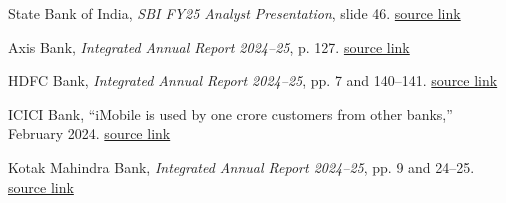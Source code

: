 \documentclass[10pt,a4paper]{article}
\begin{document}
\begin{enumerate}[label={[\arabic*]},leftmargin=24pt]
\item State Bank of India, \emph{SBI FY25 Analyst Presentation}, slide 46. \href{https://sbi.bank.in/documents/17836/0/SBI\%2BAnalyst\%2BPresentation\%2BQ4FY25.pdf/d496fee6-a237-4328-a5ff-7246e4b736b4?t=1746263845521}{source link}
\item Axis Bank, \emph{Integrated Annual Report 2024--25}, p. 127. \href{https://www.axisbank.com/docs/default-source/annual-reports/for-axis-bank/annual-report-for-the-year-2024-2025.pdf}{source link}
\item HDFC Bank, \emph{Integrated Annual Report 2024--25}, pp. 7 and 140--141. \href{https://www.hdfc.bank.in/content/dam/hdfcbankpws/in/en/pdf/annual-reports/2024-25/HDFC_Bank_Annual_Report_2024_25-310202.pdf}{source link}
\item ICICI Bank, ``iMobile is used by one crore customers from other banks,'' February 2024. \href{https://www.icici.bank.in/about-us/news-room/2024/press-release-icici-banks-imobile-is-used-by-one-crore-customers-from-other-banks}{source link}
\item Kotak Mahindra Bank, \emph{Integrated Annual Report 2024--25}, pp. 9 and 24--25. \href{https://www.kotak.com/bank/mailers/annualreport/documents/Kotak\%20Integrated\%20Annual\%20Report\%202024-25.pdf}{source link}
\end{enumerate}
\end{document}
